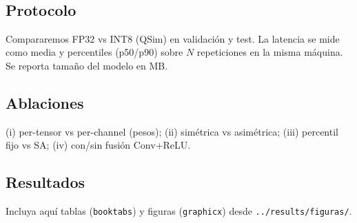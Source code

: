 \
        \subsection*{Protocolo}
        Compararemos FP32 vs INT8 (QSim) en validación y test. La latencia se mide como media y percentiles
        (p50/p90) sobre $N$ repeticiones en la misma máquina. Se reporta tamaño del modelo en MB.

        \subsection*{Ablaciones}
        (i) per-tensor vs per-channel (pesos); (ii) simétrica vs asimétrica; (iii) percentil fijo vs SA;
        (iv) con/sin fusión Conv+ReLU.

        \subsection*{Resultados}
        Incluya aquí tablas (\texttt{booktabs}) y figuras (\texttt{graphicx}) desde \texttt{../results/figuras/}.
